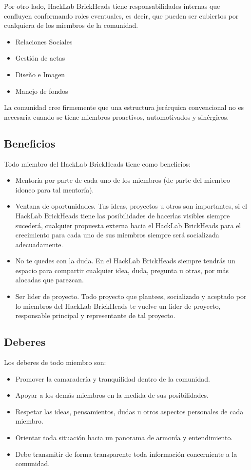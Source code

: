 \documentclass[12pt, letterpaper]{article}
\begin{document}
    Por otro lado, HackLab BrickHeads tiene responsabilidades internas que 
    confluyen conformando roles eventuales, es decir, que pueden ser cubiertos 
    por cualquiera de los miembros de la comunidad.
    \begin{itemize}
        \item Relaciones Sociales
        \item Gestión de actas
        \item Diseño e Imagen
        \item Manejo de fondos
    \end{itemize}

    La comunidad cree firmemente que una estructura jerárquica convencional no
    es necesaria cuando se tiene miembros proactivos, automotivados y
    sinérgicos.

    \subsection{Beneficios}
    Todo miembro del HackLab BrickHeads tiene como beneficios:
    \begin{itemize}
        \item Mentoría por parte de cada uno de los miembros (de parte del 
        miembro idoneo para tal mentoría).
        \item Ventana de oportunidades. Tus ideas, proyectos u otros son 
        importantes, si el HackLab BrickHeads tiene las posibilidades 
        de hacerlas visibles siempre sucederá, cualquier propuesta externa 
        hacia el HackLab BrickHeads para el crecimiento para cada uno de sus
        miembros siempre será socializada adecuadamente.
        \item No te quedes con la duda. En el HackLab BrickHeads siempre tendrás
        un espacio para compartir cualquier idea, duda, pregunta u otras, por 
        más alocadas que parezcan.
        \item Ser lider de proyecto. Todo proyecto que plantees, socializado y 
        aceptado por lo miembros del HackLab BrickHeads te vuelve un lider 
        de proyecto, responsable principal y representante de tal proyecto.
    \end{itemize}

    \subsection{Deberes}
    Los deberes de todo miembro son:
    \begin{itemize}
        \item Promover la camaradería y tranquilidad dentro de la comunidad.
        \item Apoyar a los demás miembros en la medida de sus posibilidades.
        \item Respetar las ideas, pensamientos, dudas u otros aspectos 
        personales de cada miembro.
        \item Orientar toda situación hacia un panorama de armonía y 
        entendimiento.
        \item Debe transmitir de forma transparente toda información 
        concerniente a la comunidad.
    \end{itemize}
\end{document}
